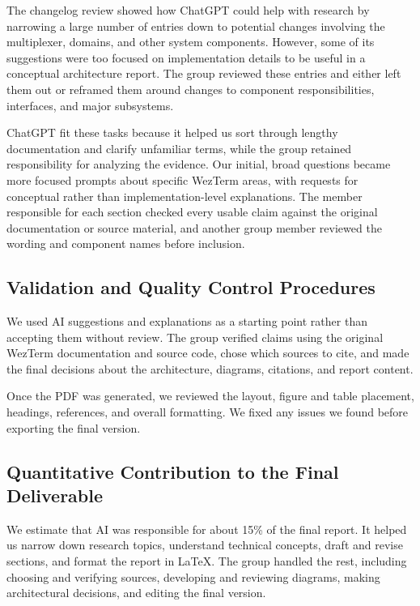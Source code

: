 The changelog review showed how ChatGPT could help with research by narrowing a large number of entries down to potential changes involving the multiplexer, domains, and other system components. However, some of its suggestions were too focused on implementation details to be useful in a conceptual architecture report. The group reviewed these entries and either left them out or reframed them around changes to component responsibilities, interfaces, and major subsystems.

ChatGPT fit these tasks because it helped us sort through lengthy documentation and clarify unfamiliar terms, while the group retained responsibility for analyzing the evidence. Our initial, broad questions became more focused prompts about specific WezTerm areas, with requests for conceptual rather than implementation-level explanations. The member responsible for each section checked every usable claim against the original documentation or source material, and another group member reviewed the wording and component names before inclusion.

\subsection{Validation and Quality Control Procedures}
\label{sec:ai-validation}

We used AI suggestions and explanations as a starting point rather than accepting them without review. The group verified claims using the original WezTerm documentation and source code, chose which sources to cite, and made the final decisions about the architecture, diagrams, citations, and report content.

Once the PDF was generated, we reviewed the layout, figure and table placement, headings, references, and overall formatting. We fixed any issues we found before exporting the final version.

\subsection{Quantitative Contribution to the Final Deliverable}
\label{sec:ai-contribution}

We estimate that AI was responsible for about 15\% of the final report. It helped us narrow down research topics, understand technical concepts, draft and revise sections, and format the report in LaTeX. The group handled the rest, including choosing and verifying sources, developing and reviewing diagrams, making architectural decisions, and editing the final version.

